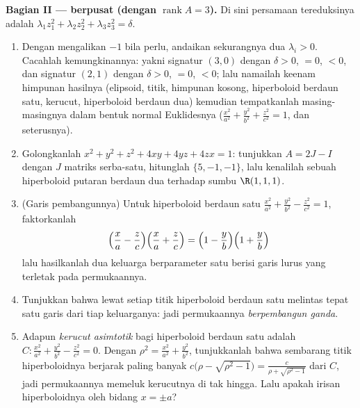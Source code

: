 \begin{problem}
\medskip
\noindent\textbf{Bagian II ---  berpusat
(dengan $\operatorname{rank}A = 3$).} Di sini persamaan tereduksinya adalah
$\lambda_1z_1^2 + \lambda_2z_2^2 + \lambda_3z_3^2 = \delta$.
\begin{enumerate}[resume]
  \item Dengan mengalikan $-1$ bila perlu, andaikan sekurangnya dua
        $\lambda_i > 0$. Cacahlah kemungkinannya:
        yakni signatur $(3, 0)$ dengan $\delta > 0$, $= 0$, $< 0$,
        dan signatur $(2, 1)$ dengan $\delta > 0$, $= 0$, $<
        0$; lalu namailah keenam himpunan hasilnya (elipsoid, titik,
        himpunan kosong, hiperboloid berdaun satu, kerucut, hiperboloid
        berdaun dua) kemudian tempatkanlah masing-masingnya dalam bentuk
        normal Euklidesnya ($\frac{x^2}{a^2} + \frac{y^2}{b^2} +
        \frac{z^2}{c^2} = 1$, dan seterusnya).
  \item Golongkanlah $x^2 + y^2 + z^2 + 4xy + 4yz + 4zx = 1$:
        tunjukkan $A = 2J - I$ dengan $J$ matriks serba-satu,
        hitunglah  $\{5, -1, -1\}$, lalu kenalilah sebuah
        hiperboloid putaran berdaun dua terhadap sumbu
        $\R(1,1,1)$.
  \item (Garis pembangunnya) Untuk hiperboloid berdaun satu
        $\frac{x^2}{a^2} + \frac{y^2}{b^2} - \frac{z^2}{c^2}
        = 1$, faktorkanlah
        \[
        \Bigl(\frac xa - \frac zc\Bigr)
        \Bigl(\frac xa + \frac zc\Bigr)
        = \Bigl(1 - \frac yb\Bigr)\Bigl(1 + \frac yb\Bigr)
        \]
        lalu hasilkanlah dua keluarga berparameter satu berisi garis
        lurus yang terletak pada permukaannya.
  \item Tunjukkan bahwa lewat setiap titik hiperboloid berdaun
        satu melintas tepat satu garis dari tiap keluarganya:
        jadi permukaannya \emph{berpembangun ganda}.
  \item Adapun \emph{kerucut asimtotik} bagi hiperboloid berdaun
        satu adalah $C : \frac{x^2}{a^2} + \frac{y^2}{b^2}
        - \frac{z^2}{c^2} = 0$. Dengan $\rho^2 = \frac{x^2}{a^2}
        + \frac{y^2}{b^2}$, tunjukkanlah bahwa sembarang titik
        hiperboloidnya berjarak paling banyak $c\bigl(\rho -
        \sqrt{\rho^2 - 1}\bigr) = \frac{c}{\rho +
        \sqrt{\rho^2 - 1}}$ dari $C$, jadi permukaannya memeluk
        kerucutnya di tak hingga. Lalu apakah irisan
        hiperboloidnya oleh bidang $x = \pm a$?
\end{enumerate}


\end{problem}
